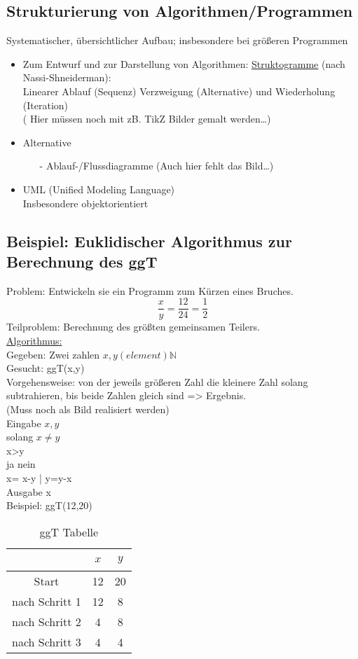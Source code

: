 \subsection{Strukturierung von Algorithmen/Programmen}
Systematischer, übersichtlicher Aufbau; insbesondere bei größeren Programmen
\begin{itemize}
\item Zum Entwurf und zur Darstellung von Algorithmen: \underline{Struktogramme} (nach Nassi-Shneiderman): \\
Linearer Ablauf (Sequenz) Verzweigung (Alternative) und Wiederholung (Iteration) \\
( Hier müssen noch mit zB. TikZ Bilder gemalt werden\dots )
\item Alternative
\begin{itemize}
\item[-] Ablauf-/Flussdiagramme (Auch hier fehlt das Bild\dots)
\end{itemize}
\item UML (Unified Modeling Language) \\
Insbesondere objektorientiert
\end{itemize}
\subsection{Beispiel: Euklidischer Algorithmus zur Berechnung des ggT}
Problem: Entwickeln sie ein Programm zum Kürzen eines Bruches.
\[
\frac{x}{y} = \frac{12}{24} = \frac{1}{2}
\]
Teilproblem: Berechnung des größten gemeinsamen Teilers. \\
\underline{Algorithmus:} \\
Gegeben: Zwei zahlen $x,y (element) \mathbb{N}$ \\
Gesucht: ggT(x,y) \\
Vorgehensweise: von der jeweils größeren Zahl die kleinere Zahl solang subtrahieren, bis beide Zahlen gleich sind => Ergebnis. \\
(Muss noch als Bild realisiert werden) \\
Eingabe $x,y$ \\
solang $x \neq y$ \\
 x>y \\
 ja	nein \\
 x= x-y | y=y-x \\
Ausgabe x \\
Beispiel: ggT(12,20)
\begin{table}[h]
	\caption[ggT Beispiel]{ggT Tabelle}
	\begin{center}
	\begin{tabular}{c|c|c}
		~& $x$ & $y$\\
		\hline
		Start & 12 & 20\\
		nach Schritt 1 & 12 & 8 \\
		nach Schritt 2 & 4 & 8 \\
		nach Schritt 3 & 4 & 4 \\
	\end{tabular}
	\end{center}
\end{table}




